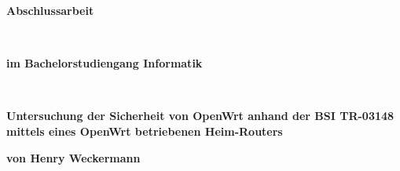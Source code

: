 \documentclass[a4paper]{book}
\def\autor{Henry Weckermann}
\begin{document}
\begin{titlepage}
  \vspace{3cm}
  \begin{center}
    
    \begin{Huge}\textbf{Abschlussarbeit}\end{Huge}\\
    \vspace{0.8cm}
    \begin{Large}\textbf{im Bachelorstudiengang Informatik}\end{Large}\\
    
    \vspace{2.2cm}
    \renewcommand{\baselinestretch}{1}\normalsize
    \begin{huge}
    \color{blue}
      \textbf{Untersuchung der Sicherheit von OpenWrt 
anhand der BSI TR-03148 mittels eines OpenWrt 
betriebenen Heim-Routers \\}
    \end{huge}
    \renewcommand{\baselinestretch}{1.5}\normalsize
    \vspace{0.7cm}
    
    
    \begin{Large}\textbf{von \autor\ \\}
    \end{Large}
  \end{center}
  
  \vspace{4.5cm}
  
\end{titlepage}
\end{document}
